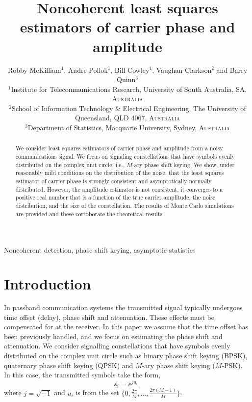 \documentclass[conference]{IEEEtran}
\title{Noncoherent least squares estimators of carrier phase and amplitude}
\author{Robby McKilliam$^{1}$, Andre Pollok$^{1}$, Bill Cowley$^{1}$, Vaughan Clarkson$^{2}$ and Barry Quinn$^{3}$ \vspace{0.2cm} \\
\small $^{1}$Institute for Telecommunications Research, University of South Australia, SA, \textsc{Australia} \vspace{0.1cm} \\
\small $^{2}$School of Information Technology \& Electrical Engineering, The University of Queensland, QLD 4067, \textsc{Australia} \vspace{0.1cm} \\
\small $^{3}$Department of Statistics, Macquarie University, Sydney, \textsc{Australia} \\}
\begin{document}
\maketitle

\begin{abstract}
We consider least squares estimators of carrier phase and amplitude from a noisy communications signal.  We focus on signaling constellations that have symbols evenly distributed on the complex unit circle, i.e., $M$-ary phase shift keying.  We show, under reasonably mild conditions on the distribution of the noise, that the least squares estimator of carrier phase is strongly consistent and asymptotically normally distributed.  However, the amplitude estimator is not consistent, it converges to a positive real number that is a function of the true carrier amplitude, the noise distribution, and the size of the constellation.  The results of Monte Carlo simulations are provided and these corroborate the theoretical results.
\end{abstract}
\begin{IEEEkeywords}
Noncoherent detection, phase shift keying, asymptotic statistics
\end{IEEEkeywords}

\section{Introduction}

\newcommand{\calC}{\mathcal C}

In passband communication systems the transmitted signal typically undergoes time offset (delay), phase shift and attenuation.  These effects must be compensated for at the receiver. In this paper we assume that the time offset has been previously handled, and we focus on estimating the phase shift and attenuation.  We consider signalling constellations that have symbols evenly distributed on the complex unit circle such as binary phase shift keying (BPSK), quaternary phase shift keying (QPSK) and $M$-ary phase shift keying ($M$-PSK).  In this case, the transmitted symbols take the form,
\[
s_i = e^{j u_i},
\]
where $j = \sqrt{-1}$ and $u_i$ is from the set $\{0, \tfrac{2\pi}{M}, \dots, \tfrac{2\pi(M-1)}{M}\}$. %
\end{document}
